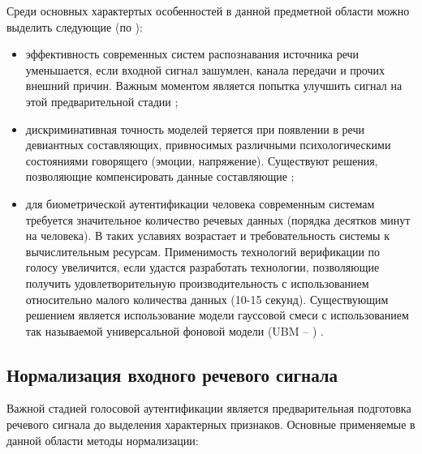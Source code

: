 Среди основных характертых особенностей в данной предметной области можно выделить следующие (по \cite{Jayanna09overview}):
\begin{itemize}
\item эффективность современных систем распознавания источника речи уменьшается, если входной сигнал зашумлен, канала передачи и прочих внешний причин. Важным моментом является попытка улучшить сигнал на этой предварительной стадии \cite{Greenwood00suv};
\item дискриминативная точность моделей теряется при появлении в речи девиантных составляющих, привносимых различными психологическими состояниями говорящего (эмоции, напряжение). Существуют решения, позволяющие компенсировать данные составляющие \cite{Alamo96discriminative};
\item для биометрической аутентификации человека современным системам требуется значительное количество речевых данных (порядка десятков минут на человека). В таких уславиях возрастает и требовательность системы к вычислительным ресурсам. Применимость технологий верификации по голосу увеличится, если удастся разработать технологии, позволяющие получить удовлетворительную производительность с использованием относительно малого количества данных (10-15 секунд). Существующим решением является использование модели гауссовой смеси с использованием так называемой универсальной фоновой модели (UBM -- ) \cite{Reynolds00speakerverification}.
\end{itemize}

\subsection{Нормализация входного речевого сигнала}

Важной стадией голосовой аутентификации является предварительная подготовка речевого сигнала до выделения характерных признаков. Основные применяемые в данной области методы нормализации:

